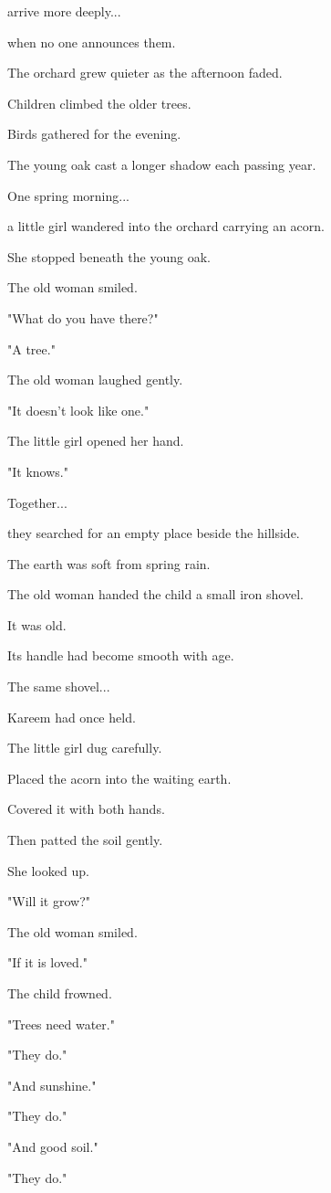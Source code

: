 \documentclass[12pt,openany]{book}
\begin{document}
arrive more deeply...

when no one announces them.

The orchard grew quieter as the afternoon faded.

Children climbed the older trees.

Birds gathered for the evening.

The young oak cast a longer shadow each passing year.

One spring morning...

a little girl wandered into the orchard carrying an acorn.

She stopped beneath the young oak.

The old woman smiled.

"What do you have there?"

"A tree."

The old woman laughed gently.

"It doesn't look like one."

The little girl opened her hand.

"It knows."

Together...

they searched for an empty place beside the hillside.

The earth was soft from spring rain.

The old woman handed the child a small iron shovel.

It was old.

Its handle had become smooth with age.

The same shovel...

Kareem had once held.

The little girl dug carefully.

Placed the acorn into the waiting earth.

Covered it with both hands.

Then patted the soil gently.

She looked up.

"Will it grow?"

The old woman smiled.

"If it is loved."

The child frowned.

"Trees need water."

"They do."

"And sunshine."

"They do."

"And good soil."

"They do."
\end{document}

